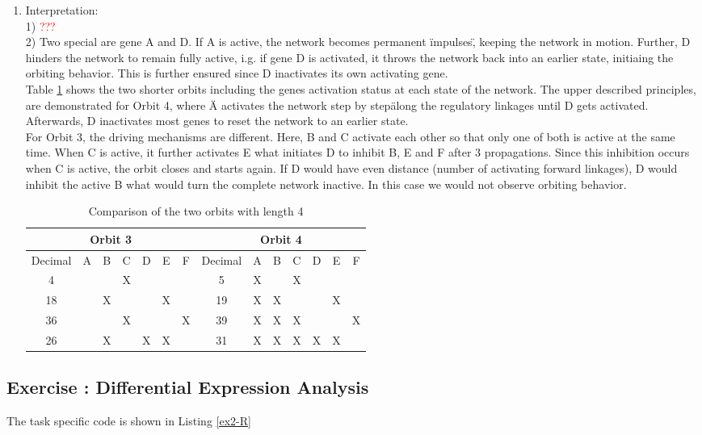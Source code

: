 \documentclass[10pt,a4paper]{article}
\newcommand{\exercise}[1]
{
  \stepcounter{subsection}
  \subsection*{Exercise \thesubsection: #1}

}
\begin{document}
\begin{enumerate}
\item Interpretation:\\
1) \textcolor{red}{???}\\
2) Two special are gene A and D. If A is active, the network becomes permanent \"impulses\", keeping the network in motion. Further, D hinders the network to remain fully active, i.g. if gene D is activated, it throws the network back into an earlier state, initiaing the orbiting behavior. This is further ensured since D inactivates its own activating gene.\\
Table \ref{ex1_tab} shows the two shorter orbits including the genes activation status at each state of the network. The upper described principles, are demonstrated for Orbit 4, where \"A activates the network step by step\" along the regulatory linkages until D gets activated. Afterwards, D inactivates most genes to reset the network to an earlier state.\\
For Orbit 3, the driving mechanisms are different. Here, B and C activate each other so that only one of both is active at the same time. When C is active, it further activates E what initiates D to inhibit B, E and F after 3 propagations. Since this inhibition occurs when C is active, the orbit closes and starts again. If D would have even distance (number of activating forward linkages), D would inhibit the active B what would turn the complete network inactive. In this case we would not observe orbiting behavior. 
\begin{table}
	\caption{Comparison of the two orbits with length 4}
	\label{ex1_tab}
	\begin{tabular}{|c|cccccc||c|cccccc|}
	\hline
	\multicolumn{7}{|c||}{Orbit 3} & \multicolumn{7}{c|}{Orbit 4}\\
	\hline
	Decimal & A & B & C & D & E & F & Decimal & A & B & C & D & E & F\\
	\hline
	4  &   &   & X &   &   &   &  5 & X &   & X &   &   &   \\
	18 &   & X &   &   & X &   & 19 & X & X &   &   & X &   \\
	36 &   &   & X &   &   & X & 39 & X & X & X &   &   & X\\
	26 &   & X &   & X & X &   & 31 & X & X & X & X & X &   \\
	\hline
	
	\end{tabular}
\end{table}
\end{enumerate}
\exercise{Differential Expression Analysis}
The task specific code is shown in Listing \ref{ex2-R}
\end{document}
